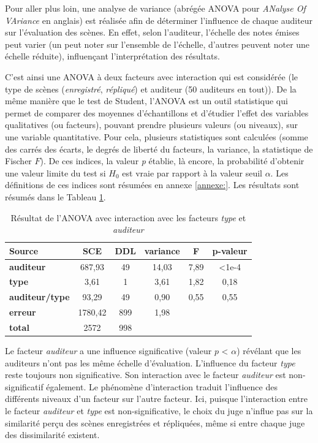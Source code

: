 Pour aller plus loin, une analyse de variance (abrégée ANOVA pour \textit{ANalyse Of VAriance} en anglais) est réalisée afin de déterminer l'influence de chaque auditeur sur l'évaluation des scènes. En effet, selon l'auditeur, l'échelle des notes émises peut varier (un peut noter sur l'ensemble de l'échelle, d'autres peuvent noter une échelle réduite), influençant l'interprétation des résultats.

C'est ainsi une ANOVA à deux facteurs avec interaction qui est considérée (le type de scènes (\textit{enregistré}, \textit{répliqué}) et auditeur (50 auditeurs en tout)). De la même manière que le test de Student, l'ANOVA est un outil statistique qui permet de comparer des moyennes d'échantillons et d'étudier l'effet des variables qualitatives (ou facteurs), pouvant prendre plusieurs valeurs (ou niveaux), sur une variable quantitative. 
Pour cela, plusieurs statistiques sont calculées (somme des carrés des écarts, le degrés de liberté du facteurs, la variance, la statistique de Fischer $F$). De ces indices, la valeur \textit{p} établie, là encore, la probabilité d'obtenir une valeur limite du test si $H_0$ est vraie par rapport à la valeur seuil $\alpha$. Les définitions de ces indices sont résumées en annexe \ref{annexe:}. Les résultats sont résumés dans le Tableau \ref{tab:anova_auditeur}.

\begin{table}[ht]
\centering
\begin{tabular}{lccccc}
\hline
\textbf{Source}     & \textbf{SCE} & \textbf{DDL} & \textbf{variance} & \textbf{F} & \textbf{p-valeur} \\
\hline
\textbf{auditeur} & 687,93 & 49 & 14,03 & 7,89 & <1e-4 \\
\hline
\textbf{type} & 3,61 & 1 & 3,61 & 1,82 & 0,18 \\
\hline
\textbf{auditeur/type} & 93,29 & 49 & 0,90 & 0,55 & 0,55 \\
\hline
\textbf{erreur}      & 1780,42 & 899 & 1,98 & &  \\
\hline
\textbf{total}      & 2572 & 998 & & & \\
\hline
\end{tabular}
\caption{Résultat de l'ANOVA avec interaction avec les facteurs \textit{type} et \textit{auditeur}}
\label{tab:anova_auditeur}
\end{table}

Le facteur \textit{auditeur} a une influence significative (valeur $p$ < $\alpha$) révélant que les auditeurs n'ont pas les même échelle d'évaluation. L'influence du facteur \textit{type} reste toujours non significative. Son interaction avec le facteur \textit{auditeur} est non-significatif également. 
Le phénomène d'interaction traduit l'influence des différents niveaux d'un facteur sur l'autre facteur. Ici, puisque l'interaction entre le facteur \textit{auditeur} et \textit{type} est non-significative, le choix du juge n'influe pas sur la similarité perçu des scènes enregistrées et répliquées, même si entre chaque juge des dissimilarité existent.

